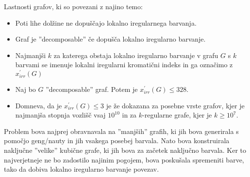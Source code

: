 \documentclass[12pt, a4paper]{article}
\begin{document}
Lastnosti grafov, ki so povezani z najino temo:
\begin{itemize}

\item Poti lihe dolžine ne dopuščajo lokalno iregularnega barvanja.
\item Graf je ''decomposable'' če dopušča lokalno iregularno barvanje.
\item Najmanjši $k$ za katerega obstaja lokalno iregularno barvanje v grafu $G$ s $k$ barvami se imenuje lokalni iregularni kromatični indeks in ga označimo z $x^'_{irr}(G)$
\item Naj bo $G$ ''decomposable'' graf. Potem je $x^'_{irr}(G) \leq 328$.
\item Domneva, da je $x^'_{irr}(G) \leq 3$ je že dokazana za posebne vrste grafov, kjer je najmanjša stopnja vozlišč vsaj $10^{10}$ in za $k$-regularne grafe, kjer je $k \geq 10^7$.

\end{itemize}

Problem bova najprej obravnavala na ''manjših'' grafih, ki jih bova generirala s pomočjo geng/nauty in jih vsakega posebej barvala. Nato bova konstruirala naključne ''velike'' kubične grafe, ki jih bova za začetek naključno barvala. Ker to najverjetneje ne bo zadostilo najinim pogojem, bova poskušala spremeniti barve, tako da dobiva lokalno iregularno barvanje povezav.
\end{document}
